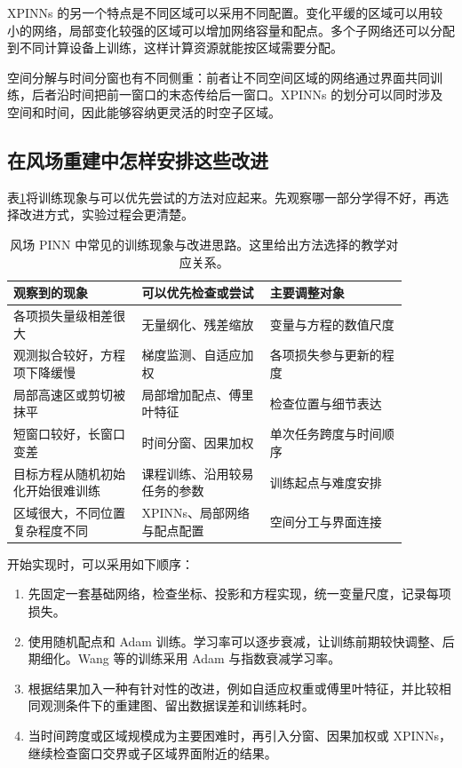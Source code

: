 XPINNs 的另一个特点是不同区域可以采用不同配置。变化平缓的区域可以用较小的网络，局部变化较强的区域可以增加网络容量和配点。多个子网络还可以分配到不同计算设备上训练，这样计算资源就能按区域需要分配。

空间分解与时间分窗也有不同侧重：前者让不同空间区域的网络通过界面共同训练，后者沿时间把前一窗口的末态传给后一窗口。XPINNs 的划分可以同时涉及空间和时间，因此能够容纳更灵活的时空子区域。

\subsection{在风场重建中怎样安排这些改进}
表\ref{tab:pinn-optimization-guide}将训练现象与可以优先尝试的方法对应起来。先观察哪一部分学得不好，再选择改进方式，实验过程会更清楚。

\begin{table}[htbp]
\centering\small
\caption{风场 PINN 中常见的训练现象与改进思路。这里给出方法选择的教学对应关系。}
\label{tab:pinn-optimization-guide}
\begin{tabular}{p{0.29\linewidth}p{0.29\linewidth}p{0.30\linewidth}}
\toprule
观察到的现象 & 可以优先检查或尝试 & 主要调整对象\\
\midrule
各项损失量级相差很大 & 无量纲化、残差缩放 & 变量与方程的数值尺度\\
观测拟合较好，方程项下降缓慢 & 梯度监测、自适应加权 & 各项损失参与更新的程度\\
局部高速区或剪切被抹平 & 局部增加配点、傅里叶特征 & 检查位置与细节表达\\
短窗口较好，长窗口变差 & 时间分窗、因果加权 & 单次任务跨度与时间顺序\\
目标方程从随机初始化开始很难训练 & 课程训练、沿用较易任务的参数 & 训练起点与难度安排\\
区域很大，不同位置复杂程度不同 & XPINNs、局部网络与配点配置 & 空间分工与界面连接\\
\bottomrule
\end{tabular}
\end{table}

开始实现时，可以采用如下顺序：
\begin{enumerate}
 \item 先固定一套基础网络，检查坐标、投影和方程实现，统一变量尺度，记录每项损失。
 \item 使用随机配点和 Adam 训练。学习率可以逐步衰减，让训练前期较快调整、后期细化。Wang 等的训练采用 Adam 与指数衰减学习率\cite{wang2023expert}。
 \item 根据结果加入一种有针对性的改进，例如自适应权重或傅里叶特征，并比较相同观测条件下的重建图、留出数据误差和训练耗时。
 \item 当时间跨度或区域规模成为主要困难时，再引入分窗、因果加权或 XPINNs，继续检查窗口交界或子区域界面附近的结果。
\end{enumerate}

